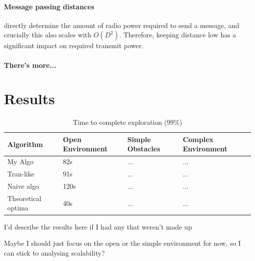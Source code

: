 \documentclass[runningheads]{llncs}
\begin{document}
\paragraph{Message passing distances} directly determine the amount of radio power required to send a message, and crucially this also scales with $O(D^2)$. Therefore, keeping distance low has a significant impact on required transmit power.

\paragraph{There's more...}


\newpage
\section{Results}

\begin{table}
\caption{Time to complete exploration (99\%)}\label{tab1}
\begin{tabular}{|l|l|l|l|}
\hline
Algorithm &  Open Environment & Simple Obstacles & Complex Environment\\
\hline
My Algo             & 82s  & ... & ...\\
Tran-like           & 91s  & ... & ...\\
Naive algo          & 120s & ... & ...\\
Theoretical optima  & 40s  & ... & ...\\
\hline
\end{tabular}
\end{table}

I'd describe the results here if I had any that weren't made up


Maybe I should just focus on the open or the simple environment for now, so I can stick to analysing scalability?




\end{document}
